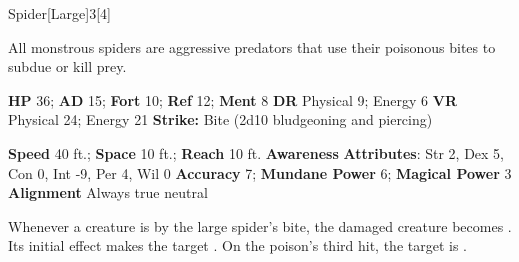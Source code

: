   \begin{monsection}{Spider}[Large]{3}[4]
    \vspace{-1em}\vspace{-1em}
    \vspace{0em}

    
    All monstrous spiders are aggressive predators that use their poisonous bites to subdue or kill prey.
  
    

    \begin{spellcontent}
      \begin{spelltargetinginfo}
        \pari \textbf{HP} 36;
          \textbf{AD} 15;
          \textbf{Fort} 10;
          \textbf{Ref} 12;
          \textbf{Ment} 8
        \pari \textbf{DR} Physical 9; Energy 6
        \pari \textbf{VR} Physical 24; Energy 21
        \pari \textbf{Strike:}
            Bite  (2d10 bludgeoning and piercing)
      \end{spelltargetinginfo}
    \end{spellcontent}
    \begin{monsterfooter}
      \pari \textbf{Speed} 40 ft.;
        \textbf{Space} 10 ft.;
        \textbf{Reach} 10 ft.
      \pari \textbf{Awareness} 
      \pari \textbf{Attributes}:
        Str 2, Dex 5,
        Con 0, Int -9,
        Per 4, Wil 0
      \pari \textbf{Accuracy} 7;
        \textbf{Mundane Power} 6;
      \textbf{Magical Power} 3
      \pari \textbf{Alignment} Always true neutral
    \end{monsterfooter}
  \end{monsection}
    Whenever a creature is  by the large spider's bite,
      the damaged creature becomes .
    Its initial effect makes the target .
    On the poison's third hit, the target is .
  
